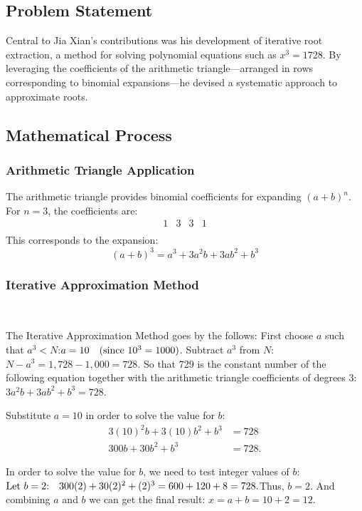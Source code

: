 \documentclass{article}
\begin{document}
\subsection{Problem Statement}
Central to Jia Xian’s contributions was his development of iterative root extraction, a method for solving polynomial equations such as $x^3=1728$. By leveraging the coefficients of the arithmetic triangle—arranged in rows corresponding to binomial expansions—he devised a systematic approach to approximate roots.

\subsection{Mathematical Process}

\subsubsection{Arithmetic Triangle Application}

The arithmetic triangle provides binomial coefficients for expanding \( (a + b)^n \). For \( n = 3 \), the coefficients are:
\[
\begin{array}{cccc}
1 & 3 & 3 & 1 \\
\end{array}
\]
This corresponds to the expansion:
\[
(a + b)^3 = a^3 + 3a^2b + 3ab^2 + b^3
\]

\subsubsection{Iterative Approximation Method}

~

The Iterative Approximation Method goes by the follows: First choose \( a \) such that \( a^3 < N \):$a = 10 \quad \text{(since \( 10^3 = 1000 \))}$. Subtract \( a^3 \) from \( N \):
$
N - a^3 = 1,\!728 - 1,\!000 = 728.
$ So that 729 is the constant number of the following equation together with the arithmetic triangle coefficients of degrees 3:
$
3a^2b + 3ab^2 + b^3 = 728.
$

Substitute \( a = 10 \) in order to solve the value for $b$:
\begin{align*}
3(10)^2b + 3(10)b^2 + b^3 &= 728 \\
300b + 30b^2 + b^3 &= 728.
\end{align*}

In order to solve the value for $b$, we need to test integer values of \( b \):
$
\text{Let \( b = 2 \):} \quad 300(2) + 30(2)^2 + (2)^3 = 600 + 120 + 8 = 728.
$Thus, \( b = 2 \). And combining \( a \) and \( b \) we can get the final result: 
$
x = a + b = 10 + 2 = \boxed{12}.
$
\end{document}
